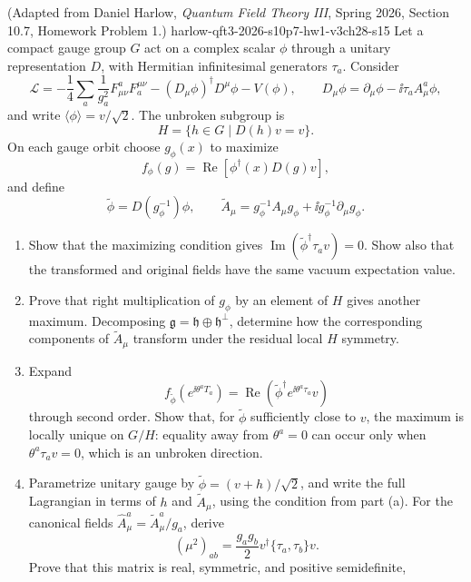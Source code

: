 \begin{enumerate}
    {(Adapted from Daniel Harlow, \emph{Quantum Field Theory III}, Spring 2026, Section 10.7,
      Homework Problem 1.)}
    {harlow-qft3-2026-s10p7-hw1-v3ch28-s15}
  Let a compact gauge group \(G\) act on a complex scalar \(\phi\) through
  a unitary representation \(D\), with Hermitian infinitesimal generators
  \(\tau_a\).  Consider
  \[
    \mathcal L=-\frac14\sum_a\frac1{g_a^2}F^a_{\mu\nu}F_a^{\mu\nu}
      -(D_\mu\phi)^\dagger D^\mu\phi-V(\phi),
    \qquad D_\mu\phi=\partial_\mu\phi-\ii\tau_aA^a_\mu\phi,
  \]
  and write \(\langle\phi\rangle=v/\sqrt2\).  The unbroken subgroup is
  \[
    H=\{h\in G\mid D(h)v=v\}.
  \]
  On each gauge orbit choose \(g_\phi(x)\) to maximize
  \[
    f_\phi(g)=\operatorname{Re}\!\left[\phi^\dagger(x)D(g)v\right],
  \]
  and define
  \[
    \widetilde\phi=D(g_\phi^{-1})\phi,
    \qquad
    \widetilde A_\mu=g_\phi^{-1}A_\mu g_\phi
       +\ii g_\phi^{-1}\partial_\mu g_\phi .
  \]
  \begin{enumerate}
    \item Show that the maximizing condition gives
      \(\operatorname{Im}(\widetilde\phi^\dagger\tau_av)=0\).
      Show also that the transformed and original fields have the same
      vacuum expectation value.
    \item Prove that right multiplication of \(g_\phi\) by an element of
      \(H\) gives another maximum.  Decomposing
      \(\mathfrak g=\mathfrak h\oplus\mathfrak h^\perp\), determine how the
      corresponding components of \(\widetilde A_\mu\) transform under the
      residual local \(H\) symmetry.
    \item Expand
      \[
        f_{\widetilde\phi}(e^{\ii\theta^aT_a})
          =\operatorname{Re}\!\left(
             \widetilde\phi^\dagger e^{\ii\theta^a\tau_a}v\right)
      \]
      through second order.  Show that, for \(\widetilde\phi\) sufficiently
      close to \(v\), the maximum is locally unique on \(G/H\): equality
      away from \(\theta^a=0\) can occur only when
      \(\theta^a\tau_av=0\), which is an unbroken direction.
    \item Parametrize unitary gauge by
      \(\widetilde\phi=(v+h)/\sqrt2\), and write the full Lagrangian in
      terms of \(h\) and \(\widetilde A_\mu\), using the condition from
      part (a).  For the canonical fields
      \(\widehat A^a_\mu=\widetilde A^a_\mu/g_a\), derive
      \[
        (\mu^2)_{ab}=\frac{g_ag_b}{2}
          v^\dagger\{\tau_a,\tau_b\}v .
      \]
      Prove that this matrix is real, symmetric, and positive semidefinite,

\end{enumerate}
\end{enumerate}
